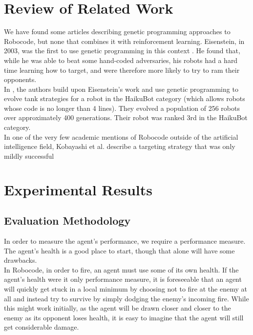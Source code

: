 \documentclass{article}
\theoremstyle{plain}
\theoremstyle{definition}
\theoremstyle{remark}
\begin{document}
\section{Review of Related Work}
We have found some articles describing genetic programming
approaches to Robocode, but none that combines it with reinforcement
learning. Eisenstein, in 2003, was the first to use genetic programming
in this context \cite{gp2}. He found that,
while he was able to beat some hand-coded adversaries, his robots
had a hard time learning how to target, and were therefore more
likely to try to ram their opponents.\\


In \cite{gp1}, the authors build upon Eisenstein's work and use genetic programming to evolve tank
strategies for a robot in the HaikuBot category (which allows
robots whose code is no longer than 4 lines). They evolved a population
of 256 robots over approximately 400 generations. Their robot was ranked
3rd in the HaikuBot category.\\

In one of the very few academic mentions of Robocode outside of the artificial
intelligence field, Kobayashi et al. describe a targeting strategy that was
only mildly successful \cite{strategies}


\section{Experimental Results}

\subsection*{Evaluation Methodology}
In order to measure the agent's performance, we require a performance measure. The agent's health is a good place to start, though that alone will have some drawbacks.\\

In Robocode, in order to fire, an agent must use some of its own health. If the agent's health were it only performance measure, it is foreseeable that an agent will quickly get stuck in a local minimum by choosing not to fire at the enemy at all and instead try to survive by simply dodging the enemy's incoming fire. While this might work initially, as the agent will be drawn closer and closer to the enemy as its opponent loses health, it is easy to imagine that the agent will still get considerable damage.\\
\end{document}
